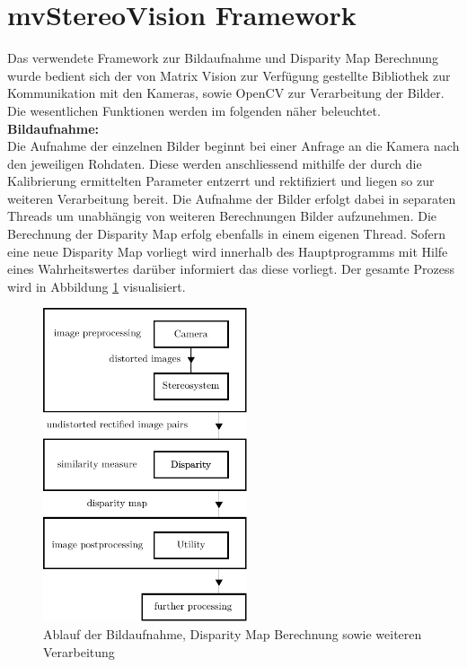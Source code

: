 \section{mvStereoVision Framework}
\label{sec:framework}
Das verwendete Framework zur Bildaufnahme und Disparity Map Berechnung wurde bedient sich der von Matrix Vision zur Verfügung gestellte Bibliothek \cite{matrixvision} zur Kommunikation mit den Kameras, sowie OpenCV \cite{opencv} zur Verarbeitung der Bilder. Die wesentlichen Funktionen werden im folgenden näher beleuchtet.\\

\noindent
\textbf{Bildaufnahme:}\\
Die Aufnahme der einzelnen Bilder beginnt bei einer Anfrage an die Kamera nach den jeweiligen Rohdaten. Diese werden anschliessend mithilfe der durch die Kalibrierung ermittelten Parameter entzerrt und rektifiziert und liegen so zur weiteren Verarbeitung bereit. Die Aufnahme der Bilder erfolgt dabei in separaten Threads um unabhängig von weiteren Berechnungen Bilder aufzunehmen. Die Berechnung der Disparity Map erfolg ebenfalls in einem eigenen Thread. Sofern eine neue Disparity Map vorliegt wird innerhalb des Hauptprogramms mit Hilfe eines Wahrheitswertes darüber informiert das diese vorliegt. Der gesamte Prozess wird in Abbildung \ref{fig:framework_pipeline} visualisiert.\\

\begin{figure}[h]
	\begin{center}
		\includegraphics[width=6cm]{img/framework_pipeline.pdf}
	\end{center}
	\caption{Ablauf der Bildaufnahme, Disparity Map Berechnung sowie weiteren Verarbeitung}
	\label{fig:framework_pipeline}
\end{figure}


